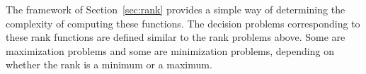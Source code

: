 The framework of Section~\ref{sec:rank} provides a simple way of determining the complexity of computing these functions.
The decision problems corresponding to these rank functions are defined similar to the rank problems above.
Some are maximization problems and some are minimization problems, depending on whether the rank is a minimum or a maximum.

